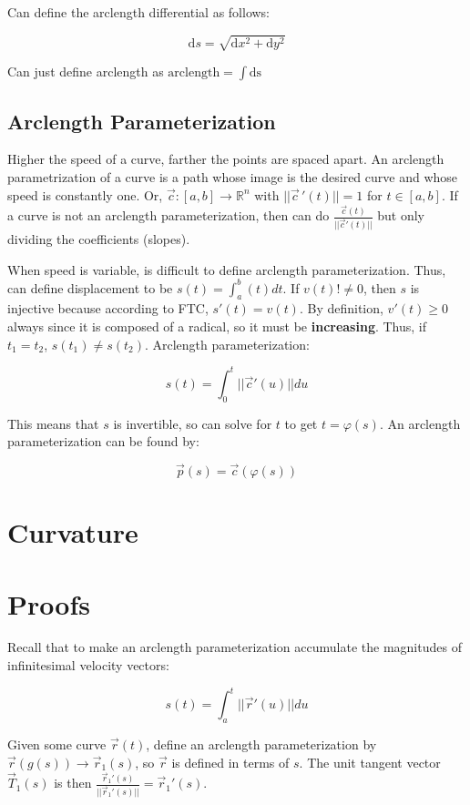 Can define the arclength differential as follows:

\[\mathrm{d}s=\sqrt{\mathrm{d}x^2+\mathrm{d}y^2}\]

Can just define arclength as $\text{arclength}=\int \mathrm{ds}$

\subsection{Arclength Parameterization}

Higher the speed of a curve, farther the points are spaced apart.
An arclength parametrization of a curve is a path whose image is the desired curve and whose speed is constantly one.
Or, $\vec{c}:[a,b]\to\mathbb{R}^n$ with $||\vec{c}\,'(t)||=1$ for $t\in[a,b]$.
If a curve is not an arclength parameterization, then can do $\frac{\vec{c}(t)}{||\vec{c}'(t)||}$ but only dividing the coefficients (slopes).\newline

\noindent
When speed is variable, is difficult to define arclength parameterization.
Thus, can define displacement to be $s(t)=\int_a^b (t)dt$. If $v(t)!\neq 0$,
then $s$ is injective because according to FTC, $s'(t)=v(t)$.
By definition, $v'(t)\geq 0$ always since it is composed of a radical, so it must be \textbf{increasing}.
Thus, if $t_1=t_2$, $s(t_1)\neq s(t_2)$. Arclength parameterization:

\[s(t)=\int_0^t||\vec{c}'(u)||du\]

\noindent
This means that $s$ is invertible, so can solve for $t$ to get $t=\varphi(s)$.
An arclength parameterization can be found by:

\[\boxed{\vec{p}(s)=\vec{c}(\varphi(s))}\]

\section{Curvature}

\section{Proofs}

Recall that to make an arclength parameterization accumulate the magnitudes of infinitesimal velocity vectors:

\[s(t)=\int_a^t ||\vec{r}'(u)||du\]

Given some curve $\vec{r}(t)$, define an arclength parameterization by $\vec{r}(g(s))\rightarrow \vec{r}_1(s)$, so 
$\vec{r}$ is defined in terms of $s$. The unit tangent vector $\vec{T}_1(s)$ is then $\frac{\vec{r}_1'(s)}{||\vec{r}_1'(s)||}=\vec{r}_1'(s)$.

